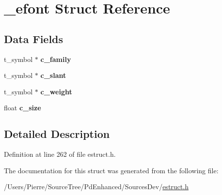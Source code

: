 \hypertarget{struct__efont}{\section{\-\_\-efont Struct Reference}
\label{struct__efont}
}
\subsection*{Data Fields}
\begin{DoxyCompactItemize}
\item 
\hypertarget{struct__efont_ad0a12c28988a03d63f0a63ae52545b7e}{t\-\_\-symbol $\ast$ {\bfseries c\-\_\-family}}\label{struct__efont_ad0a12c28988a03d63f0a63ae52545b7e}

\item 
\hypertarget{struct__efont_afe59dcb9bf09d16691d63350aba4e22f}{t\-\_\-symbol $\ast$ {\bfseries c\-\_\-slant}}\label{struct__efont_afe59dcb9bf09d16691d63350aba4e22f}

\item 
\hypertarget{struct__efont_a1e65976e3fc680a945be671bbcada87c}{t\-\_\-symbol $\ast$ {\bfseries c\-\_\-weight}}\label{struct__efont_a1e65976e3fc680a945be671bbcada87c}

\item 
\hypertarget{struct__efont_a0c2e0d8b2b562976f466b37e1804e896}{float {\bfseries c\-\_\-size}}\label{struct__efont_a0c2e0d8b2b562976f466b37e1804e896}

\end{DoxyCompactItemize}


\subsection{Detailed Description}


Definition at line 262 of file estruct.\-h.



The documentation for this struct was generated from the following file\-:\begin{DoxyCompactItemize}
\item 
/\-Users/\-Pierre/\-Source\-Tree/\-Pd\-Enhanced/\-Sources\-Dev/\hyperlink{estruct_8h}{estruct.\-h}\end{DoxyCompactItemize}
